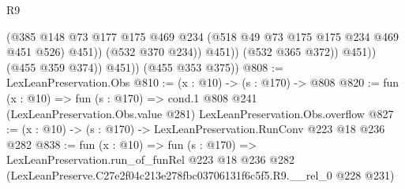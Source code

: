 \begin{lexlean}{R9}
\begin{coremodule}
                          (@385
                            @148
                            @73
                            @177
                            @175
                            @469
                            @234
                            (@518 @49 @73 @175 @175 @234 @469 @451 @526)
                            @451))
                        (@532 @370 @234))
                      @451))
                  (@532 @365 @372))
                @451))
            (@455 @359 @374))
          @451))
      (@455 @353 @375))
@808 := LexLeanPreservation.Obs
@810 := (x : @10) -> (s : @170) -> @808
@820 := fun (x : @10) =>
  fun (s : @170) =>
  cond.{1} @808 @241 (LexLeanPreservation.Obs.value @281) LexLeanPreservation.Obs.overflow
@827 := (x : @10) -> (s : @170) -> LexLeanPreservation.RunConv @223 @18 @236 @282
@838 := fun (x : @10) =>
  fun (s : @170) =>
  LexLeanPreservation.run_of_funRel
    @223
    @18
    @236
    @282
    (LexLeanPreserve.C27e2f04c213e278fbc03706131f6c5f5.R9.__rel_0 @228 @231)
\end{coremodule}
\end{lexlean}
